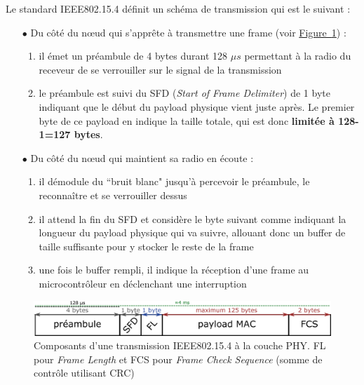 \documentclass[]{report}
\newcommand{\wordlink}[2]{\hyperref[#2]{#1~\ref{#2}}}
\begin{document}
\par Le standard IEEE802.15.4 définit un schéma de transmission qui est le suivant \cite{stack-IoT} \cite{app-sec-openWSN} :
\vspace{0.2cm}
\begin{itemize}
\item[$\bullet$] Du côté du nœud qui s'apprête à transmettre une frame (voir \wordlink{Figure}{fig:IEEE802.15.4-PHY}) :
	\begin{enumerate}
	\item il émet un préambule de 4 bytes durant 128 $\mu s$ permettant à la radio du receveur de se verrouiller sur le signal de la transmission
	\item le préambule est suivi du SFD (\textit{Start of Frame Delimiter}) de 1 byte indiquant que le début du payload physique vient juste après. Le premier byte de ce payload en indique la taille totale, qui est donc \textbf{limitée à 128-1=127 bytes}.
	\end{enumerate}

\vspace{0.2cm}

\item[$\bullet$] Du côté du nœud qui maintient sa radio en écoute :
	\begin{enumerate}
	\item il démodule du ``bruit blanc" jusqu'à percevoir le préambule, le reconnaître et se verrouiller dessus
	\item il attend la fin du SFD et considère le byte suivant comme indiquant la longueur du payload physique qui va suivre, allouant donc un buffer de taille suffisante pour y stocker le reste de la frame
	\item une fois le buffer rempli, il indique la réception d'une frame au microcontrôleur en déclenchant une interruption
	\end{enumerate}

\end{itemize}

\vspace{0.8cm}

	\begin{figure}[!ht]
	\centering
	\includegraphics[width=0.9\linewidth]{IEEE802_15_4-PHY}
	\caption{Composants d'une transmission IEEE802.15.4 à la couche PHY. FL pour \textit{Frame Length} et FCS pour \textit{Frame Check Sequence} (somme de contrôle utilisant CRC)}
	\label{fig:IEEE802.15.4-PHY}
	\end{figure}
	
\end{document}
